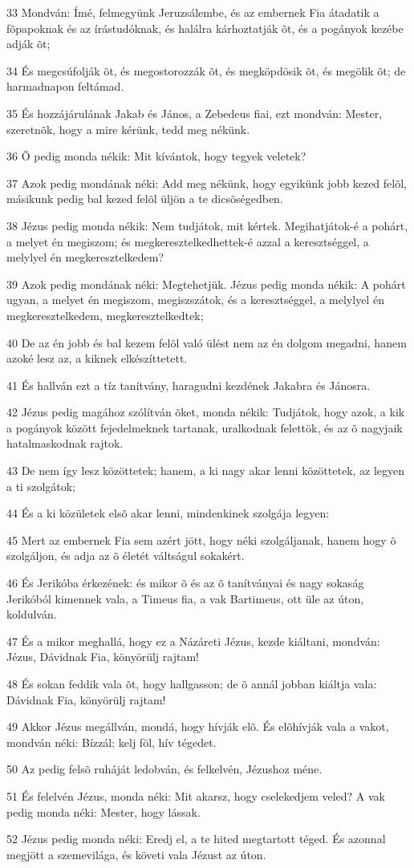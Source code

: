 \par 33 Mondván: Ímé, felmegyünk Jeruzsálembe, és az embernek Fia átadatik a fõpapoknak és az írástudóknak, és halálra kárhoztatják õt, és a pogányok kezébe adják õt;
\par 34 És megcsúfolják õt, és megostorozzák õt, és megköpdösik õt, és megölik õt; de harmadnapon feltámad.
\par 35 És hozzájárulának Jakab és János, a Zebedeus fiai, ezt mondván: Mester, szeretnõk, hogy a mire kérünk, tedd meg nékünk.
\par 36 Õ pedig monda nékik: Mit kívántok, hogy tegyek veletek?
\par 37 Azok pedig mondának néki: Add meg nékünk, hogy egyikünk jobb kezed felõl, másikunk pedig bal kezed felõl üljön a te dicsõségedben.
\par 38 Jézus pedig monda nékik: Nem tudjátok, mit kértek. Megihatjátok-é a pohárt, a melyet én megiszom; és megkeresztelkedhettek-é  azzal a keresztséggel, a melylyel én megkeresztelkedem?
\par 39 Azok pedig mondának néki: Megtehetjük. Jézus pedig monda nékik: A pohárt ugyan, a melyet én megiszom, megiszszátok, és a keresztséggel, a melylyel én megkeresztelkedem, megkeresztelkedtek;
\par 40 De az én jobb és bal kezem felõl való ülést nem az én dolgom megadni, hanem azoké lesz az, a kiknek elkészíttetett.
\par 41 És hallván ezt a tíz tanítvány, haragudni kezdének Jakabra és Jánosra.
\par 42 Jézus pedig magához szólítván õket, monda nékik: Tudjátok, hogy azok, a kik a pogányok között fejedelmeknek tartanak, uralkodnak felettök, és az õ nagyjaik hatalmaskodnak rajtok.
\par 43 De nem így lesz közöttetek; hanem, a ki nagy akar lenni közöttetek, az legyen a ti szolgátok;
\par 44 És a ki közületek elsõ akar lenni, mindenkinek szolgája legyen:
\par 45 Mert az embernek Fia sem azért jött, hogy néki szolgáljanak, hanem hogy õ szolgáljon, és adja az õ életét váltságul sokakért.
\par 46 És Jerikóba érkezének: és mikor õ és az õ tanítványai és nagy sokaság Jerikóból kimennek vala, a Timeus fia, a vak Bartimeus, ott üle az úton, koldulván.
\par 47 És a mikor meghallá, hogy ez a Názáreti Jézus, kezde kiáltani, mondván: Jézus, Dávidnak Fia, könyörülj rajtam!
\par 48 És sokan feddik vala õt, hogy hallgasson; de õ annál jobban kiáltja vala: Dávidnak Fia, könyörülj rajtam!
\par 49 Akkor Jézus megállván, mondá, hogy hívják elõ. És elõhívják vala a vakot, mondván néki: Bízzál; kelj föl, hív tégedet.
\par 50 Az pedig felsõ ruháját ledobván, és felkelvén, Jézushoz méne.
\par 51 És felelvén Jézus, monda néki: Mit akarsz, hogy cselekedjem veled? A vak pedig monda néki: Mester, hogy lássak.
\par 52 Jézus pedig monda néki: Eredj el, a te hited megtartott téged. És azonnal megjött a szemevilága, és követi vala Jézust az úton.


